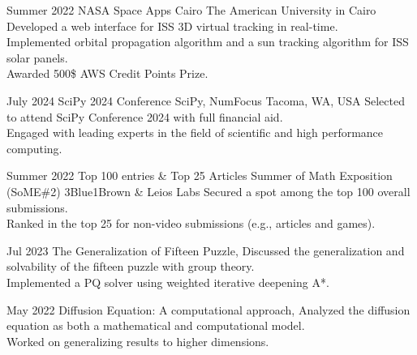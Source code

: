 \documentclass[]{report}
\begin{document}
\entry 
    {Summer 2022}
    {NASA Space Apps Cairo}
    {The American University in Cairo }{}
    { 
        \tb Developed a web interface for ISS 3D virtual tracking in real-time. \\
        \tb Implemented orbital propagation algorithm and a sun tracking algorithm for ISS solar panels.\\
        \tb Awarded 500\$ AWS Credit Points Prize.
    }


\entry
    {July 2024}
    {SciPy 2024 Conference}  
    {SciPy, NumFocus}
    {Tacoma, WA, USA}
    {
        \tb Selected to attend SciPy Conference 2024 with full financial aid.\\
        \tb Engaged with leading experts in the field of scientific and high performance computing.
    }

\entry
    {Summer 2022}
    {Top 100 entries \& Top 25 Articles}
    {Summer of Math Exposition (SoME\#2)}
    {3Blue1Brown \& Leios Labs}  
    {
        \tb Secured a spot among the top 100 overall submissions.\\
        \tb Ranked in the top 25 for non-video submissions (e.g., articles and games).
    }


\entry
    {Jul 2023}
    {The Generalization of Fifteen Puzzle, 
    }  
    {} {}
    {
      \tb Discussed the generalization and solvability of the fifteen puzzle with group theory.\\
      \tb Implemented a PQ solver using weighted iterative deepening A*.
    } 

\entry
    {May 2022}
    {Diffusion Equation: A computational approach, }  
    {} 
    {}
    {
        \tb Analyzed the diffusion equation as both a mathematical and computational model.\\
        \tb Worked on generalizing results to higher dimensions.    
    }
\end{document}
